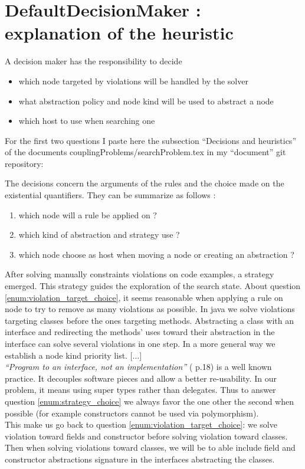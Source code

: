 \documentclass[]{article}
\begin{document}
\section{DefaultDecisionMaker : explanation of the heuristic}
\label{section:defaultDecisionMaker}

A decision maker has the responsibility to decide
\begin{itemize}
\item which node targeted by violations will be handled by the solver
\item what abstraction policy and node kind will be used to abstract a node
\item which host to use when searching one
\end{itemize}

For the first two questions I paste here the subsection ``Decisions and heuristics'' of the documents couplingProblems/searchProblem.tex in my ``document'' git repository:


\begin{framed}

The decisions concern the arguments of the rules and the choice made on the existential quantifiers. They can be summarize as follows :
\begin{enumerate}
\item \label{enum:violation_target_choice} which node will a rule be applied on ?
\item \label{enum:strategy_choice} which kind of abstraction and strategy use ?
\item \label{enum:host_choice} which node choose as host when moving a node or creating an abstraction ?
\end{enumerate}

After solving manually constraints violations on code examples, a strategy emerged. This strategy guides the exploration of the search state. About question \ref{enum:violation_target_choice}, it seems reasonable when applying a rule on node to try to remove as many violations as possible. In java we solve violations targeting classes before the ones targeting methods. Abstracting a class with an interface and redirecting the methods' uses toward their abstraction in the interface can solve several violations in one step. 
In a more general way we establish a node kind priority list.
[...]\\
\emph{``Program to an interface, not an implementation''} (\cite{gamma1993gof} p.18) is a well known practice. It decouples software pieces and allow a better re-usability. In our problem, it means using super types rather than delegates. Thus to answer question \ref{enum:strategy_choice} we always favor the one other the second when possible (for example constructors cannot be used via polymorphism). \\
This make us go back to question \ref{enum:violation_target_choice}: we solve violation toward fields and constructor before solving violation toward classes. Then when solving violations toward classes, we will be to able include field and constructor abstractions signature in the interfaces abstracting the classes.
\end{framed}
\end{document}
